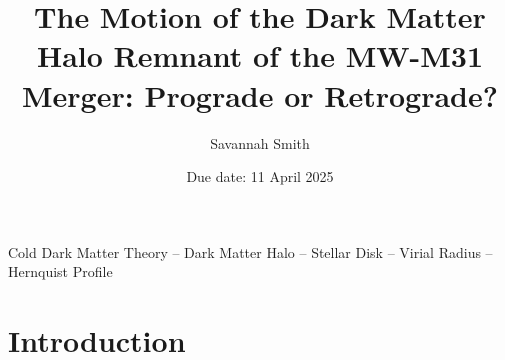 \documentclass[fleqn,usenatbib]{mnras}
\title{The Motion of the Dark Matter Halo Remnant of the MW-M31 Merger: Prograde or Retrograde?}
\author{Savannah Smith}
\date{Due date: 11 April 2025}
\begin{document}
\label{firstpage}
\pagerange{\pageref{firstpage}--\pageref{lastpage}}
\maketitle

\begin{keywords}
Cold Dark Matter Theory -- Dark Matter Halo -- Stellar Disk -- Virial Radius -- Hernquist Profile
\end{keywords}



\section{Introduction}
\end{document}
